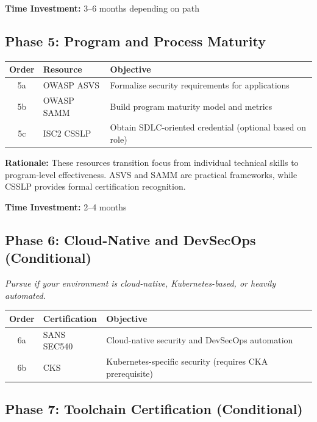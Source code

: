 \documentclass[11pt,letterpaper]{article}
\begin{document}
\textbf{Time Investment:} 3--6 months depending on path

\subsection{Phase 5: Program and Process Maturity}

\begin{table}[H]
\centering
\begin{tabularx}{\textwidth}{c l >{\raggedright\arraybackslash}X}
\toprule
\textbf{Order} & \textbf{Resource} & \textbf{Objective} \\
\midrule
5a & OWASP ASVS & Formalize security requirements for applications \\
\midrule
5b & OWASP SAMM & Build program maturity model and metrics \\
\midrule
5c & ISC2 CSSLP & Obtain SDLC-oriented credential (optional based on role) \\
\bottomrule
\end{tabularx}
\end{table}

\textbf{Rationale:} These resources transition focus from individual technical skills to program-level effectiveness. ASVS and SAMM are practical frameworks, while CSSLP provides formal certification recognition.

\textbf{Time Investment:} 2--4 months

\subsection{Phase 6: Cloud-Native and DevSecOps (Conditional)}

\textit{Pursue if your environment is cloud-native, Kubernetes-based, or heavily automated.}

\begin{table}[H]
\centering
\begin{tabularx}{\textwidth}{c l >{\raggedright\arraybackslash}X}
\toprule
\textbf{Order} & \textbf{Certification} & \textbf{Objective} \\
\midrule
6a & SANS SEC540 & Cloud-native security and DevSecOps automation \\
\midrule
6b & CKS & Kubernetes-specific security (requires CKA prerequisite) \\
\bottomrule
\end{tabularx}
\end{table}

\subsection{Phase 7: Toolchain Certification (Conditional)}
\end{document}
